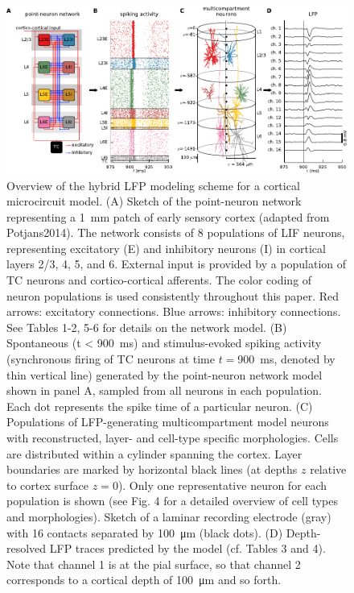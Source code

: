 \begin{figure}[htbp]
\begin{center}
\includegraphics[width=\columnwidth]{Figures/Ch-LFPy/hybridmodel}
\caption{ 
Overview of the hybrid LFP modeling scheme for a cortical microcircuit model. 
(A) Sketch of the point-neuron network representing a 
\SI{1}{\milli\metre} patch of early sensory cortex (adapted from Potjans2014). 
The network consists of 8 populations of LIF neurons, representing excitatory (E) and inhibitory neurons (I) in cortical layers 2/3, 4, 5, and 6. 
External input is provided by a population of TC neurons and cortico-cortical afferents. 
The color coding of neuron populations is used consistently throughout this paper. 
Red arrows: excitatory connections. Blue arrows: inhibitory connections. 
See Tables 1-2, 5-6 for details on the network model. 
(B) Spontaneous (t < \SI{900}{\milli\second}) and stimulus-evoked spiking activity (synchronous firing of TC neurons at time $t = $\SI{900}{\milli\second}, denoted by thin vertical line) generated by the point-neuron network model shown in panel A, sampled from all neurons in each population. Each dot represents the spike time of a particular neuron. 
(C) Populations of LFP-generating multicompartment model neurons with reconstructed, layer- and cell-type specific morphologies. 
Cells are distributed within a cylinder spanning the cortex. Layer boundaries are marked by horizontal black lines (at depths $z$ relative to cortex surface $z = 0$). Only one representative neuron for each population is shown 
(see Fig. 4 for a detailed overview of cell types and morphologies). 
Sketch of a laminar recording electrode (gray) with 16 contacts separated by \SI{100}{\micro\metre} (black dots). 
(D) Depth-resolved LFP traces predicted by the model (cf. Tables 3 and 4). 
Note that channel 1 is at the pial surface, so that channel 2 corresponds to a cortical depth of \SI{100}{\micro\metre} and so forth.
}
\label{fig:LFPy:hybridmodel}
\end{center}
\end{figure}



